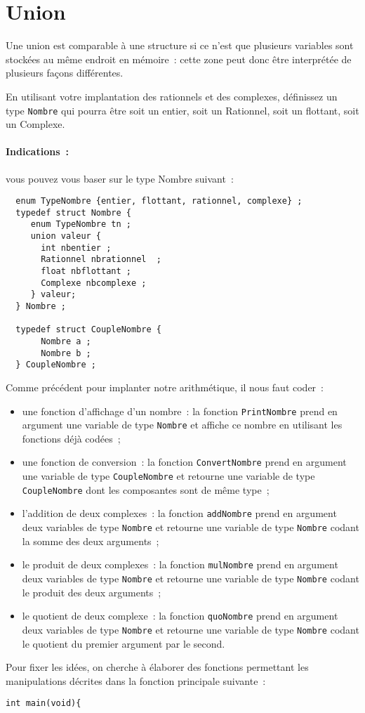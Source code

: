 \section{Union}
\label{sec:Union}
Une union est comparable \`a  une structure si  ce n'est que plusieurs
variables sont stock\'ees au  m\^eme endroit en m\'emoire~: cette zone
peut    donc    \^etre    interpr\'et\'ee  de    plusieurs  fa\c{c}ons
diff\'erentes.
\begin{exercice}
  En  utilisant votre  implantation  des rationnels  et des complexes,
  d\'efinissez  un   type \texttt{Nombre} qui   pourra  \^etre soit un
  entier, soit un Rationnel, soit un flottant, soit un Complexe.
\paragraph{Indications~:} vous pouvez vous baser sur le type Nombre suivant~:
\begin{verbatim}
  enum TypeNombre {entier, flottant, rationnel, complexe} ;
  typedef struct Nombre {
     enum TypeNombre tn ;
     union valeur {
       int nbentier ;
       Rationnel nbrationnel  ;
       float nbflottant ;
       Complexe nbcomplexe ;
     } valeur;
  } Nombre ;

  typedef struct CoupleNombre {
       Nombre a ;
       Nombre b ;
  } CoupleNombre ;
\end{verbatim}
  Comme pr\'ec\'edent pour implanter notre arithm\'etique, il nous faut coder~:
\begin{itemize}
\item  une   fonction  d'affichage    d'un nombre~:  la    fonction
  \texttt{PrintNombre} prend    en  argument une   variable de  type
  \texttt{Nombre} et affiche ce nombre en utilisant les fonctions d\'ej\`a cod\'ees~;
\item une fonction de  conversion~: la fonction \texttt{ConvertNombre}
  prend en   argument  une variable de type   \texttt{CoupleNombre} et
  retourne une   variable  de  type \texttt{CoupleNombre}    dont  les
  composantes sont de m\^eme type~;
\item l'addition de deux complexes~: la fonction \texttt{addNombre} prend en
  argument deux variables de  type \texttt{Nombre} et  retourne une
  variable   de  type   \texttt{Nombre} codant la    somme  des deux
  arguments~;
\item le  produit  de deux complexes~:  la fonction \texttt{mulNombre}
  prend en argument  deux variables  de type \texttt{Nombre}   et
  retourne une variable de type  \texttt{Nombre} codant le produit des
  deux arguments~;
\item le  quotient  de deux complexe~:  la fonction \texttt{quoNombre}
  prend en argument deux variables de type \texttt{Nombre} et retourne
  une variable de type \texttt{Nombre}  codant le quotient du  premier
  argument par le second.
\end{itemize}
Pour fixer les id\'ees, on cherche \`a \'elaborer des fonctions permettant les manipulations d\'ecrites dans la fonction principale suivante~:
\begin{verbatim}
int main(void){


\end{verbatim}
\end{exercice}
